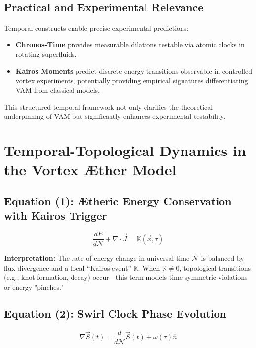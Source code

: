 \documentclass[preprint]{revtex4-2}
\begin{document}
\subsection{Practical and Experimental Relevance}

Temporal constructs enable precise experimental predictions:
\begin{itemize}
    \item \textbf{Chronos-Time} provides measurable dilations testable via atomic clocks in rotating superfluids.
    \item \textbf{Kairos Moments} predict discrete energy transitions observable in controlled vortex experiments, potentially providing empirical signatures differentiating VAM from classical models.
\end{itemize}

This structured temporal framework not only clarifies the theoretical underpinning of VAM but significantly enhances experimental testability.


\section{Temporal-Topological Dynamics in the Vortex Æther Model}

\subsection*{Equation (1): Ætheric Energy Conservation with Kairos Trigger}
\begin{equation}
    \frac{dE}{d\mathcal{N}} + \nabla \cdot \vec{J} = \mathbb{K}(\vec{x}, \tau)
    \label{eq:Kairos_trigger_energy_conservation}
\end{equation}

\textbf{Interpretation:} The rate of energy change in universal time $\mathcal{N}$ is balanced by flux divergence and a local ``Kairos event'' $\mathbb{K}$. When $\mathbb{K} \neq 0$, topological transitions (e.g., knot formation, decay) occur—this term models time-symmetric violations or energy "pinches."

\subsection*{Equation (2): Swirl Clock Phase Evolution}
\begin{equation}
    \nabla \vec{S}(t) = \frac{d}{d\mathcal{N}} \vec{S}(t) + \omega(\tau) \hat{n}
\label{eq:Swirl_clock_phase_evolution}
\end{equation}
\end{document}
